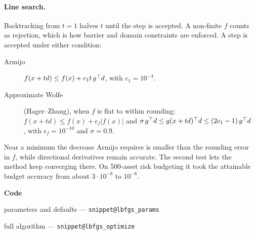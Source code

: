 \documentclass[11pt,a4paper]{article}
\makeatletter
\newcommand{\snippetsource}[1]{\csname snippet@#1\endcsname}
\newcommand{\snippet}[3]{%
  }
\newenvironment{codepointers}{%
  \par\smallskip\begingroup\footnotesize\noindent\textcolor{blue!50!black}{\textbf{Code}}\par\nopagebreak
  \begin{list}{}{\setlength{\leftmargin}{1.2em}\setlength{\itemsep}{0pt}\setlength{\parsep}{0pt}\setlength{\topsep}{1pt}}}%
  {\end{list}\endgroup\smallskip}
\newcommand{\codeitem}[2]{\item #2 --- \texttt{\snippetsource{#1}}}
\makeatother
\begin{document}
\paragraph{Line search.} Backtracking from $t=1$ halves $t$ until the step is accepted. A
non-finite $f$ counts as rejection, which is how barrier and domain constraints are
enforced. A step is accepted under either condition:
\begin{description}
  \item[Armijo] $f(x+td)\le f(x)+c_1t\,g^\top d$, with $c_1=10^{-4}$.
  \item[Approximate Wolfe] (Hager--Zhang), when $f$ is flat to within rounding:
        $f(x+td)\le f(x)+\epsilon_f|f(x)|$ and
        $\sigma\,g^\top d\le g(x+td)^\top d\le(2c_1-1)\,g^\top d$, with $\epsilon_f=10^{-10}$ and
        $\sigma=0.9$.
\end{description}
Near a minimum the decrease Armijo requires is smaller than the rounding error in $f$,
while directional derivatives remain accurate. The second test lets the method keep
converging there. On 500-asset risk budgeting it took the attainable budget accuracy from
about $3\cdot10^{-8}$ to $10^{-8}$.
\snippet{lbfgs_two_loop}{C++}{Two-loop recursion}
\snippet{lbfgs_line_search}{C++}{Line search: Armijo or approximate Wolfe}
\begin{codepointers}
  \codeitem{lbfgs_params}{parameters and defaults}
  \codeitem{lbfgs_optimize}{full algorithm}
\end{codepointers}
\end{document}
